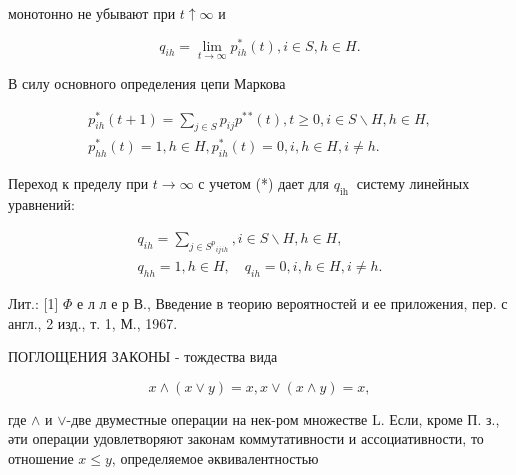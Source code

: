 \documentclass[10pt]{article}
\begin{document}
монотонно не убывают при $t \uparrow \infty$ и



\[

q_{i h}=\lim _{t \rightarrow \infty} p_{i h}^{*}(t), i \in S, h \in H .

\]



В силу основного определения цепи Маркова



\[

\begin{gathered}

p_{i h}^{*}(t+1)=\sum_{j \in S} p_{i j} p^{*}{ }^{*}(t), t \geqslant 0, i \in S \backslash H, h \in H, \\

p_{h h}^{*}(t)=1, h \in H, p_{i h}^{*}(t)=0, i, h \in H, i \neq h .

\end{gathered}

\]



Переход к пределу при $t \rightarrow \infty$ с учетом (*) дает для $q_{\text {ih }}$ систему линейных уравнений:



\[

\begin{gathered}

q_{i h}=\sum_{j \in S^{p}{ }_{i j}{ }_{i h}}, i \in S \backslash H, h \in H, \\

q_{h h}=1, h \in H, \quad q_{i h}=0, i, h \in H, i \neq h .

\end{gathered}

\]



Лит.: [1] $\Phi$ е л л е р В., Введение в теорию вероятностей и ее приложения, пер. с англ., 2 изд., т. 1, М., 1967.



ПОГЛОЩЕНИЯ ЗАКОНЫ - тождества вида



\[

x \wedge(x \vee y)=x, x \vee(x \wedge y)=x,

\]



где $\wedge$ и $\vee$-две двуместные операции на нек-ром множестве L. Если, кроме П. з., әти операции удовлетворяют законам коммутативности и ассоциативности, то отношение $x \leqslant y$, определяемое әквивалентностью
\end{document}
